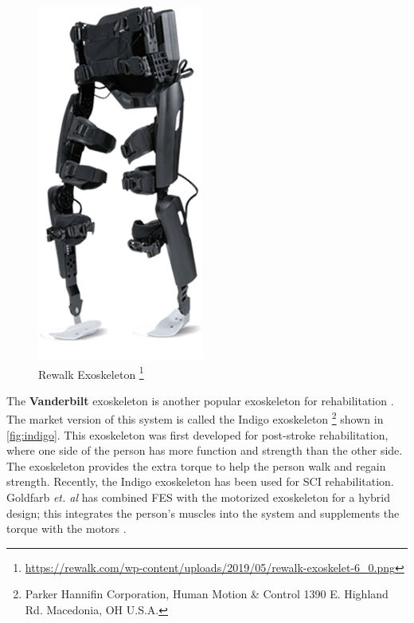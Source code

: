 \begin{figure}[H]
    \centering
    \includegraphics[scale=0.4]{images/background/rewalk-exoskelet.png}
   \caption[Rewalk Exoskeleton]{Rewalk Exoskeleton  \protect\footnote{\url{ https://rewalk.com/wp-content/uploads/2019/05/rewalk-exoskelet-6_0.png}}}
    \label{fig:rewalk}
\end{figure}


 The \textbf{Vanderbilt} exoskeleton is another popular exoskeleton for rehabilitation \cite{gasser2017design}. The market version of this system is called the Indigo exoskeleton \footnote{Parker Hannifin Corporation, Human Motion & Control 1390 E. Highland Rd. Macedonia, OH U.S.A.} shown in \autoref{fig:indigo}. This exoskeleton was first developed for post-stroke rehabilitation, where one side of the person has more function and strength than the other side. The exoskeleton provides the extra torque to help the person walk and regain strength. Recently, the Indigo exoskeleton has been used for SCI rehabilitation. Goldfarb \textit{et. al} has combined FES with the motorized exoskeleton for a hybrid design; this integrates the person's muscles into the system and supplements the torque with the motors \cite{ha2012enhancing}. 
 

